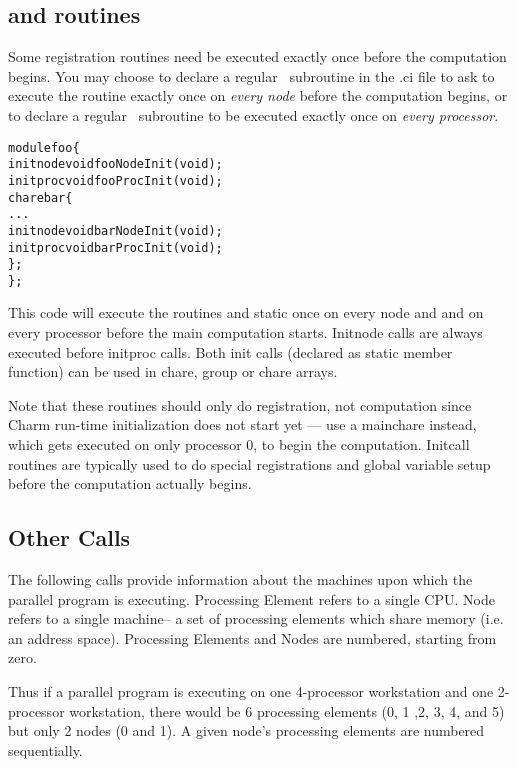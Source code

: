 \subsection{ and  routines}

\label{initcall}
Some registration routines need be executed exactly once
before the computation begins. You may choose to 
declare a regular  \CC\ subroutine  in the .ci file
to ask \charmpp to execute the routine exactly once on {\em every node} 
before the computation begins, or to declare a regular  \CC\ subroutine 
 to be executed exactly once on {\em every processor}.

\begin{alltt}
module foo \{
    initnode void fooNodeInit(void);
    initproc void fooProcInit(void);
    chare bar \{
        ...
        initnode void barNodeInit(void);
        initproc void barProcInit(void);
    \};
\};
\end{alltt}

This code will execute the routines  and static 
 once on every node and 
and  on every processor before the main computation 
starts.
Initnode calls are always executed before initproc calls.
Both init calls (declared as static member function) can be used in chare, 
group or chare arrays.

Note that these routines should only do registration, not computation since
Charm run-time initialization does not start yet ---
use a mainchare instead, which gets executed on only processor 0,
to begin the computation.  Initcall routines are typically
used to do special registrations and global variable setup
before the computation actually begins.


\subsection{Other Calls}

\label{other Charm++ calls}

The following calls provide information about the machines upon which the
parallel program is executing.  Processing Element refers to a single CPU.
Node refers to a single machine-- a set of processing elements which share
memory (i.e. an address space).  Processing Elements and Nodes are numbered,
starting from zero.

Thus if a parallel program is executing on one 4-processor workstation and one
2-processor workstation, there would be 6 processing elements (0, 1 ,2, 3, 4,
and 5) but only 2 nodes (0 and 1).  A given node's processing elements are
numbered sequentially.

